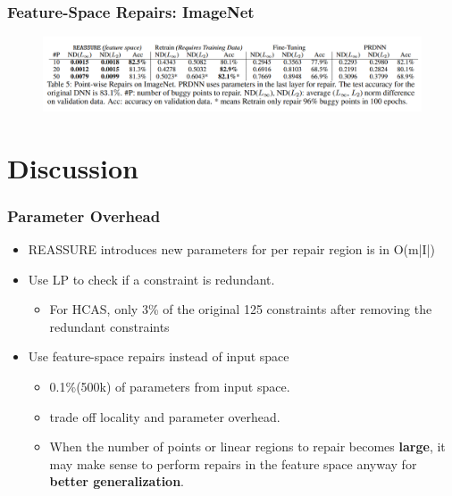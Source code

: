 \documentclass[aspectratio=169 %
,serif,mathserif]{beamer}
\begin{document}
\begin{frame}
	\frametitle{Feature-Space Repairs: ImageNet}
	\begin{figure}[htbp]
		\includegraphics[width=\linewidth]{12.png}
	\end{figure}
\end{frame}

\section{Discussion}
\begin{frame}
	\frametitle{Parameter Overhead}
	\begin{itemize}
		\item REASSURE introduces new parameters for per repair region is in O(m|I|) \pause
		\item Use LP to check if a constraint is redundant.
		\begin{itemize} 
			\item For HCAS, only 3\% of the original 125 constraints after removing the redundant constraints
		\end{itemize} \pause
		\item Use feature-space repairs instead of input space
		\begin{itemize}
			\item 0.1\%(500k) of parameters from input space.
			\item trade off locality and parameter overhead.
			\item When the number of points or linear regions to repair becomes \textbf{large}, it may make sense to perform repairs in the feature space anyway for \textbf{better generalization}.
		\end{itemize}
	\end{itemize}
\end{frame}






\begin{frame}
\hfill
{}
\linespread{3}\selectfont
\end{frame}
\end{document}
